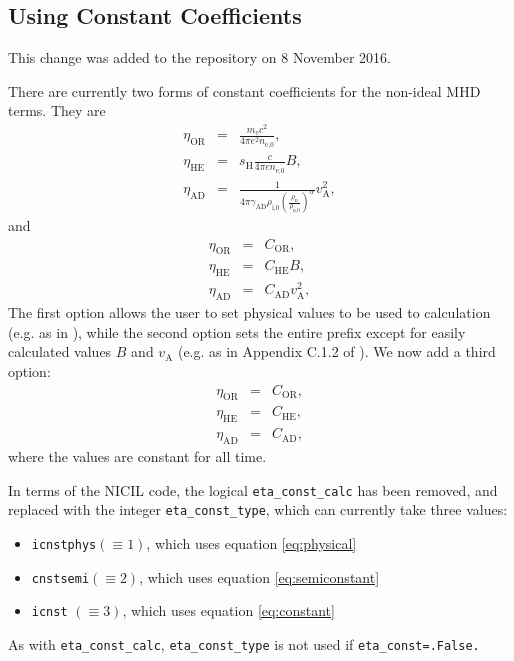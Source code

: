 \documentclass{pasa}%
\begin{document}
\subsection{Using Constant Coefficients}
This change was added to the repository on 8 November 2016.

There are currently two forms of constant coefficients for the non-ideal MHD terms.  They are 
\begin{subequations}
\label{eq:physical}
\begin{eqnarray}
\eta_\text{OR} &=&  \frac{m_\text{e}c^2}{4\pi e^2 n_\text{e,0}}, \\
\eta_\text{HE} &=&  s_\text{H} \frac{c}{4\pi e n_\text{e,0}}B, \\
\eta_\text{AD} &=&  \frac{1}{4\pi \gamma_\text{AD} \rho_\text{i,0}\left(\frac{\rho_\text{n}}{\rho_\text{n,0}}\right)^\alpha}v_\text{A}^2,
\end{eqnarray}
\end{subequations}
and
\begin{subequations}
\label{eq:semiconstant}
\begin{eqnarray}
\eta_\text{OR} &=&  C_\text{OR}, \\
\eta_\text{HE} &=&  C_\text{HE}B, \\
\eta_\text{AD} &=&  C_\text{AD}v_\text{A}^2 ,
\end{eqnarray}
\end{subequations}
The first option allows the user to set physical values to be used to calculation (e.g. as in \citet{PandeyWardle2008}), while the second option sets the entire prefix except for easily calculated values $B$ and $v_\text{A}$ (e.g. as in Appendix C.1.2 of \citet{WPB2016}).  We now add a third option:
\begin{subequations}
\label{eq:constant}
\begin{eqnarray}
\eta_\text{OR} &=&  C_\text{OR}, \\
\eta_\text{HE} &=&  C_\text{HE}, \\
\eta_\text{AD} &=&  C_\text{AD},
\end{eqnarray}
\end{subequations}
where the values are constant for all time.

In terms of the {\sc NICIL} code, the logical {\tt eta\_const\_calc} has been removed, and replaced with the integer {\tt eta\_const\_type}, which can currently take three values:
\begin{itemize}
\item  {\tt icnstphys}$(\equiv 1)$, which uses equation \eqref{eq:physical}
\item  {\tt cnstsemi}$(\equiv 2)$, which uses equation \eqref{eq:semiconstant}
\item  {\tt icnst}        $(\equiv 3)$, which uses equation \eqref{eq:constant}
\end{itemize}
As with {\tt eta\_const\_calc}, {\tt eta\_const\_type} is not used if {\tt eta\_const=.False.}
\end{document}
